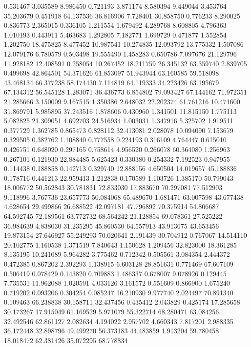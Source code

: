 0.531467
3.035589
8.986450
0.721193
3.871174
8.580394
9.449044
3.453764
35.203679
0.451918
64.137536
36.816906
7.728401
30.858750
0.776233
8.290025
0.836773
2.365015
0.336105
1.211554
1.679492
4.289768
8.608805
4.796363
1.010193
0.443911
5.463683
1.292805
7.182771
1.699729
0.471877
1.552854
1.202750
18.475825
8.477452
10.987541
10.274835
12.093792
13.775332
1.507086
12.079176
6.780579
0.503498
19.555490
1.458283
0.650786
7.097676
21.129796
11.928182
12.408591
0.258054
10.267452
18.211759
26.345132
63.359740
2.839705
0.499698
42.864501
54.371626
61.853097
51.943944
63.160585
59.518098
43.468134
66.377238
58.174430
7.114819
64.119333
34.223426
63.195679
67.134312
56.545128
1.283071
36.436773
6.854802
79.093427
67.144162
71.972351
21.285666
3.150009
9.167515
1.350386
2.648032
22.202374
61.761216
10.471600
31.869791
5.985895
37.243516
1.878606
0.430960
1.341501
11.815150
1.775113
5.082825
21.309051
4.692703
24.516934
1.003031
1.347916
5.325702
1.919511
0.377729
1.362785
0.865473
0.828112
32.413081
2.028078
10.094090
7.153679
0.329505
0.382762
1.108840
0.777558
0.224193
0.316109
4.764447
0.615010
0.426751
0.648020
0.297165
0.758614
4.956520
0.266078
60.364080
1.256963
0.267101
0.121930
22.884485
5.625423
0.330380
0.254332
7.192523
0.947955
0.114438
0.188858
0.142713
0.329740
12.888156
4.650504
14.019657
45.188836
0.178716
0.441213
22.959413
1.212838
0.170589
1.103726
1.385170
50.799043
18.006772
50.562843
30.781831
72.833030
17.883670
70.297081
77.512903
9.118996
3.767736
23.657773
50.084068
65.489670
1.681471
63.007598
43.677438
4.628654
29.499866
26.688522
42.097181
47.796892
70.375914
54.806687
64.592745
72.189561
63.772732
68.564242
21.128854
69.078361
27.525222
36.984639
4.838030
31.235295
45.860530
64.557913
43.913675
43.653456
19.873154
27.646927
55.249293
70.020641
2.191439
30.704912
0.767067
14.514110
20.102775
1.160538
1.371519
7.840643
1.150628
1.209456
32.823000
18.361285
8.135195
10.241089
5.964282
3.775462
0.712342
0.505561
3.084354
2.444372
0.472385
0.867202
2.392293
1.138915
6.603128
28.851631
0.771469
67.607109
0.506419
0.078429
0.143820
0.709883
1.486337
0.678007
9.078926
0.129445
7.735531
11.962088
1.020591
4.033126
3.161572
0.551609
0.866900
1.675240
0.719202
0.093206
0.304254
0.085247
16.210930
9.977740
2.024497
70.891340
0.109463
66.238838
30.158711
32.437456
0.435412
2.043829
0.425174
17.285658
30.173267
17.915049
61.169529
5.971079
55.322714
68.280471
63.084256
32.492546
62.861127
2.082634
4.194022
2.957702
4.660343
7.817201
2.988335
36.172448
32.898796
49.499270
56.373183
44.483859
1.913204
59.780458
18.018472
62.381426
35.072295
68.778834
